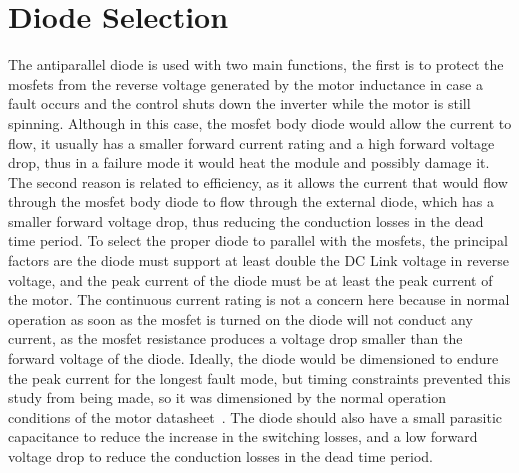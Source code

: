 \section{Diode Selection}
The antiparallel diode is used with two main functions, the first is to protect the \glspl{mosfet} from the reverse voltage generated by the motor inductance in case a fault occurs and the control shuts down the inverter while the motor is still spinning. Although in this case, the \gls{mosfet} body diode would allow the current to flow, it usually has a smaller forward current rating and a high forward voltage drop, thus in a failure mode it would heat the module and possibly damage it. The second reason is related to efficiency, as it allows the current that would flow through the \gls{mosfet} body diode to flow through the external diode, which has a smaller forward voltage drop, thus reducing the conduction losses in the dead time period.
To select the proper diode to parallel with the \glspl{mosfet}, the principal factors are the diode must support at least double the DC Link voltage in reverse voltage, and the peak current of the diode must be at least the peak current of the motor. The continuous current rating is not a concern here because in normal operation as soon as the \gls{mosfet} is turned on the diode will not conduct any current, as the \gls{mosfet} resistance produces a voltage drop smaller than the forward voltage of the diode. Ideally, the diode would be dimensioned to endure the peak current for the longest fault mode, but timing constraints prevented this study from being made, so it was dimensioned by the normal operation conditions of the motor datasheet~\cite{amk:DD5-14-10-POW}. The diode should also have a small parasitic capacitance to reduce the increase in the switching losses, and a low forward voltage drop to reduce the conduction losses in the dead time period.

